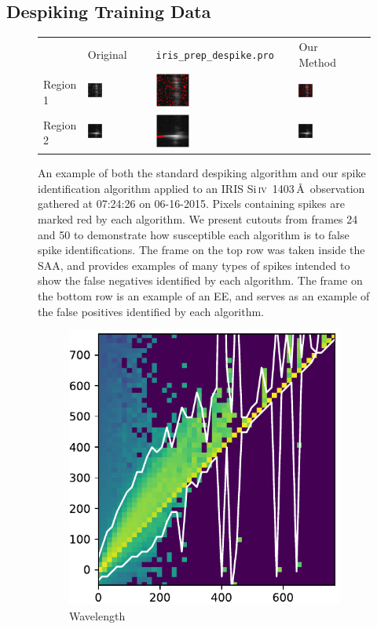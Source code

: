 \documentclass[10pt,letterpaper]{article}
\newcommand{\SiIV}{Si\,\textsc{iv}~1403\,\AA}
\newcommand{\tilewidth}{0.25\textwidth}
\newcommand{\EE}{\ac{EE}}
\newcommand{\SAA}{\ac{SAA}}
\begin{document}
		\subsection{Despiking Training Data}	\label{sec_dspk}	
			
			\begin{figure}[h!]
	
				\renewcommand{\arraystretch}{0}
				\setlength{\tabcolsep}{0pt}
				\begin{tabular}{m{} m{\tilewidth} m{\tilewidth} m{\tilewidth} @{}m{0pt}@{}}
					& \centering Original & \centering \texttt{iris\_prep\_despike.pro} & \centering Our Method & \\[5mm]
					Region 1 & \includegraphics[width=\tilewidth]{fig/orig_1} & \includegraphics[width=\tilewidth]{fig/despike_1} & \includegraphics[width=\tilewidth]{fig/dspk_1} & \\
					Region 2 & \includegraphics[width=\tilewidth]{fig/orig_2} & \includegraphics[width=\tilewidth]{fig/despike_2} & \includegraphics[width=\tilewidth]{fig/dspk_2} & \\
				\end{tabular}
				
				\caption{An example of both the standard despiking algorithm and our spike identification algorithm applied to an IRIS \SiIV\ observation gathered at 07:24:26 on 06-16-2015.
					Pixels containing spikes are marked red by each algorithm.
					We present cutouts from frames 24 and 50 to demonstrate how susceptible each algorithm is to false spike identifications. 
					The frame on the top row was taken inside the \SAA, and provides examples of many types of spikes intended to show the false negatives identified by each algorithm.
					The frame on the bottom row is an example of an \EE, and serves as an example of the false positives identified by each algorithm.}
				
				\label{dspk_ex}
				
			\end{figure}
			
			\begin{figure}[h!]
				\centering
				\begin{subfigure}[t]{0.288\textwidth}
					\centering
					\includegraphics[width=\textwidth]{fig/hist_0}
					\caption{Wavelength}
				\end{subfigure}
				~ 
				\begin{subfigure}[t]{0.288\textwidth}
					\centering
	
\end{subfigure}
\end{figure}
\end{document}
